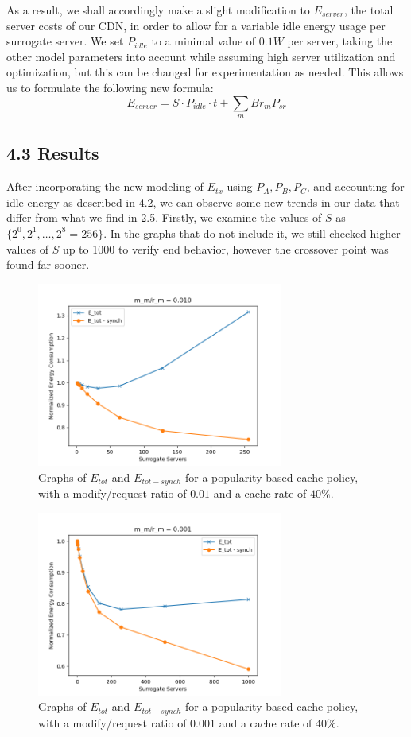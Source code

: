 \documentclass[
	a4paper, %
	10pt, %
	unnumberedsections, %
	twoside, %
]{LTJournalArticle}
\begin{document}
As a result, we shall accordingly make a slight modification to $E_{server}$, the total server costs of our CDN, in order to allow for a variable idle energy usage per surrogate server. We set $P_{idle}$ to a minimal value of $0.1W$ per server, taking the other model parameters into account while assuming high server utilization and optimization, but this can be changed for experimentation as needed. This allows us to formulate the following new formula:
\[E_{server} = S\cdot P_{idle}\cdot t + \sum_mBr_mP_{sr}\]

\subsection{4.3 Results}
After incorporating the new modeling of $E_{tx}$ using $P_A, P_B, P_C$, and accounting for idle energy as described in 4.2, we can observe some new trends in our data that differ from what we find in 2.5. Firstly, we examine the values of $S$ as $\{2^0, 2^1, \ldots, 2^8 = 256\}$. In the graphs that do not include it, we still checked higher values of $S$ up to 1000 to verify end behavior, however the crossover point was found far sooner. 
\begin{figure}[!hbt]
	\begin{center}
		\includegraphics[width=8.1cm]{plots/new0.01.png}
	\end{center}
	\caption{Graphs of $E_{tot}$ and $E_{tot - synch}$ for a popularity-based cache policy, with a modify/request ratio of $0.01$ and a cache rate of $40\%$.}	
\end{figure}
\begin{figure}[!hbt]
	\begin{center}
            \includegraphics[width=8.1cm]{plots/new0.001.png}
	\end{center}
	\caption{Graphs of $E_{tot}$ and $E_{tot - synch}$ for a popularity-based cache policy, with a modify/request ratio of 0.001 and a cache rate of $40\%$.}	
\end{figure}
\end{document}
